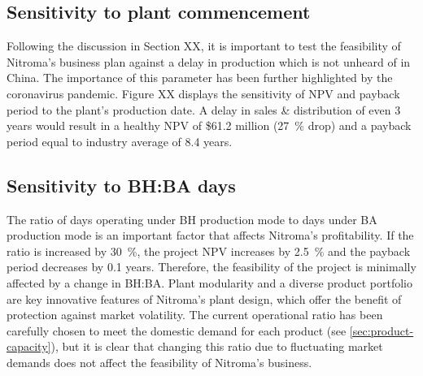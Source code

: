 \subsection{Sensitivity to plant commencement}
Following the discussion in Section XX, it is important to test the feasibility of Nitroma’s business plan against a delay in production which is not unheard of in China. The importance of this parameter has been further highlighted by the coronavirus pandemic. Figure XX displays the sensitivity of NPV and payback period to the plant’s production date. A delay in sales \& distribution of even 3 years would result in a healthy NPV of \$61.2 million (\SI{27}{\percent} drop) and a payback period equal to industry average of 8.4 years. 

\subsection{Sensitivity to BH:BA days}
The ratio of days operating under BH production mode to days under BA production mode is an important factor that affects Nitroma’s profitability. If the ratio is increased by \SI{30}{\percent}, the project NPV increases by \SI{2.5}{\percent} and the payback period decreases by 0.1 years. Therefore, the feasibility of the project is minimally affected by a change in BH:BA. Plant modularity and a diverse product portfolio are key innovative features of Nitroma’s plant design, which offer the benefit of protection against market volatility. The current operational ratio has been carefully chosen to meet the domestic demand for each product (see \cref{sec:product-capacity}), but it is clear that changing this ratio due to fluctuating market demands does not affect the feasibility of Nitroma’s business.

